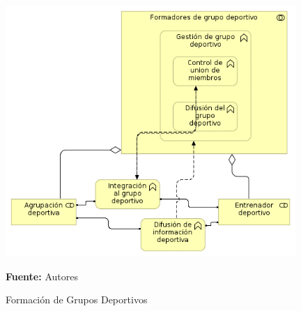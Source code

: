 \begin{figure}[!htb]
  \begin{center}
    \includegraphics[width=11cm]{./imagenes/business_functions/formaciongruposdeportivos.png}
    \caption{Formación de Grupos Deportivos}
    \label{fig:formacion_grupos_deportivos}
    \textbf{Fuente:}  Autores
  \end{center}
\end{figure}

